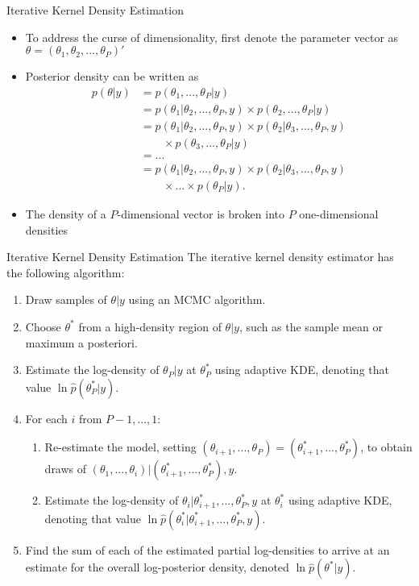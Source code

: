 \documentclass{beamer}
\begin{document}
\begin{frame}{Iterative Kernel Density Estimation}
\begin{itemize}
	\item To address the curse of dimensionality, first denote the parameter vector as $\theta = (\theta_1, \theta_2, ..., \theta_P)'$
	\item Posterior density can be written as
\begin{align}
p(\theta|y)
&= p(\theta_1, ..., \theta_P|y) \\
&= p(\theta_1|\theta_2, ..., \theta_P, y)\times p(\theta_2, ..., \theta_P|y) \\
&= p(\theta_1|\theta_2, ..., \theta_P, y)\times p(\theta_2|\theta_3, ..., \theta_P, y) \\ &\qquad\times p(\theta_3, ..., \theta_P|y) \\
&= ... \\
&= p(\theta_1|\theta_2, ..., \theta_P, y)\times p(\theta_2|\theta_3, ..., \theta_P, y)\\ &\qquad\times ...\times p(\theta_P|y).
\end{align}
	\item The density of a $P$-dimensional vector is broken into $P$ one-dimensional densities
\end{itemize}
\end{frame}

\begin{frame}{Iterative Kernel Density Estimation}
The iterative kernel density estimator has the following algorithm:
\begin{enumerate}
	\item Draw samples of $\theta|y$ using an MCMC algorithm.
	\item Choose $\theta^*$ from a high-density region of $\theta|y$, such as the sample mean or maximum a posteriori.
	\item Estimate the log-density of $\theta_P|y$ at $\theta_P^*$ using adaptive KDE, denoting that value $\ln \hat{p}(\theta_P^*|y)$.
	\item For each $i$ from $P-1, ..., 1$:
	\begin{enumerate}
		\item Re-estimate the model, setting $(\theta_{i+1}, ..., \theta_P) = (\theta_{i+1}^*, ..., \theta_P^*)$, to obtain draws of $(\theta_1, ..., \theta_i)|(\theta_{i+1}^*, ..., \theta_P^*), y$.
		\item Estimate the log-density of $\theta_i|\theta_{i+1}^*, ..., \theta_P^*, y$ at $\theta_i^*$ using adaptive KDE, denoting that value $\ln \hat{p}(\theta_i^*|\theta_{i+1}^*, ..., \theta_P^*, y)$.
	\end{enumerate}
	\item Find the sum of each of the estimated partial log-densities to arrive at an estimate for the overall log-posterior density, denoted $\ln \hat{p}(\theta^*|y)$.
\end{enumerate}
\end{frame}
\end{document}
